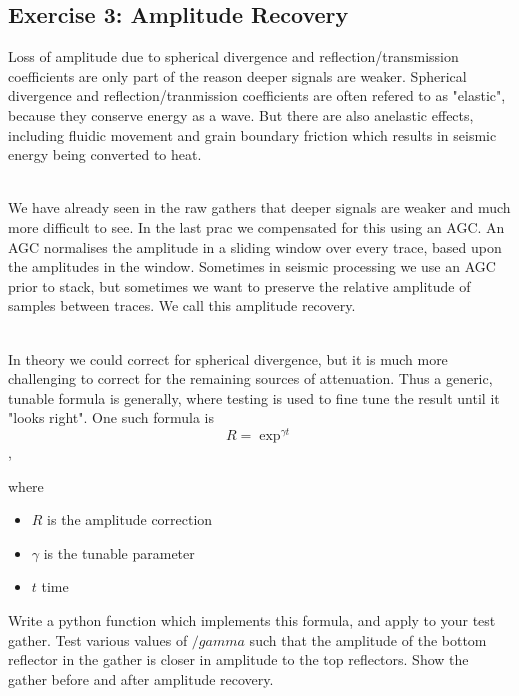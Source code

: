 \documentclass[a4paper, 10pt]{article}
\begin{document}
\subsection*{Exercise 3: Amplitude Recovery}
Loss of amplitude due to spherical divergence and reflection/transmission coefficients are only part of the reason deeper signals are weaker.  Spherical divergence and reflection/tranmission coefficients are often refered to as "elastic", because they conserve energy as a wave.  But there are also anelastic effects, including fluidic movement and grain boundary friction which results in seismic energy being converted to heat.  
\par~\\
We have already seen in the raw gathers that deeper signals are weaker and much more difficult to see. In the last prac we compensated for this using an AGC.  An AGC normalises the amplitude in a sliding window over every trace, based upon the amplitudes in the window.  Sometimes in seismic processing we use an AGC prior to stack, but sometimes we want to preserve the relative amplitude of samples between traces.  We call this amplitude recovery.
\par~\\
In theory we could correct for spherical divergence, but it is much more challenging to correct for the remaining sources of attenuation.  Thus a generic, tunable formula is generally, where testing is used to fine tune the result until it "looks right".  One such formula is
\[ R = \exp^{\gamma t}\],

where
\begin{itemize}
\item $R$ is the amplitude correction
\item $\gamma$ is the tunable parameter
\item $t$ time
\end{itemize}

Write a python function which implements this formula, and apply to your test gather.  Test various values of $/gamma$ such that the amplitude of the bottom reflector in the gather is closer in amplitude to the top reflectors. Show the gather before and after amplitude recovery.
\end{document}

